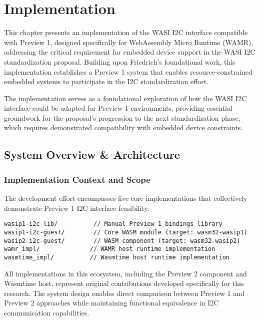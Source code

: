\chapter{Implementation}
\label{chap:implementation}

This chapter presents an implementation of the WASI I2C interface compatible with Preview 1, designed specifically for WebAssembly Micro Runtime (WAMR), addressing the critical requirement for embedded device support in the WASI I2C standardization proposal. Building upon Friedrich's foundational work, this implementation establishes a Preview 1 system that enables resource-constrained embedded systems to participate in the I2C standardization effort.

The implementation serves as a foundational exploration of how the WASI I2C interface could be adapted for Preview 1 environments, providing essential groundwork for the proposal's progression to the next standardization phase, which requires demonstrated compatibility with embedded device constraints.

\section{System Overview \& Architecture}
\label{sec:system-overview}

\subsection{Implementation Context and Scope}

The development effort encompasses five core implementations that collectively demonstrate Preview 1 I2C interface feasibility:

\begin{verbatim}
wasip1-i2c-lib/          // Manual Preview 1 bindings library
wasip1-i2c-guest/        // Core WASM module (target: wasm32-wasip1)
wasip2-i2c-guest/        // WASM component (target: wasm32-wasip2)
wamr_impl/              // WAMR host runtime implementation
wasmtime_impl/          // Wasmtime host runtime implementation
\end{verbatim}

All implementations in this ecosystem, including the Preview 2 component and Wasmtime host, represent original contributions developed specifically for this research. The system design enables direct comparison between Preview 1 and Preview 2 approaches while maintaining functional equivalence in I2C communication capabilities.

